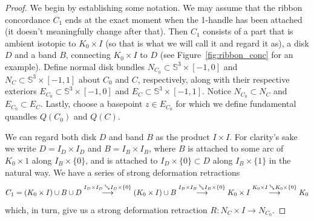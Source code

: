 \documentclass[10pt,a4paper]{amsart}
\newcommand{\retract}{\mathbin{\rotatebox[origin=c]{-45}{$\rightsquigarrow$}}}
\newcommand{\s}{\mathbb{S}}
\begin{document}
\begin{proof} 
	We begin by establishing some notation. 
	We may assume that the ribbon concordance $C_1$ ends at the exact moment when the 1-handle has been attached (it doesn't meaningfully change after that).
	Then $C_1$ consists of a part that is ambient isotopic to $K_0 \times I$ (so that is what we will call it and regard it as), a disk $D$
	and a band $B$, connecting $K_0 \times I$ to $D$ (see Figure~\ref{fig:ribbon_conc} for an example). Define normal disk bundles
	$N_{C_0} \subset \s^3 \times [-1,0]$ and $N_C \subset \s^3 \times [-1,1]$ about $C_0$ and $C$, respectively,
	along with their respective exteriors $E_{C_0} \subset \s^3 \times [-1,0]$ and $E_C \subset \s^3 \times [-1,1]$.
	Notice $N_{C_0}  \subset N_C$ and $E_{C_0} \subset E_C$.
	Lastly, choose a basepoint $z \in E_{C_0}$ for which we define fundamental quandles $Q(C_0)$ and $Q(C)$.


	We can regard both disk $D$ and band $B$ as the product $I \times I$. For clarity's sake we write $D = I_D \times I_D$ and $B = I_B \times I_B$, where $B$ is attached
	to some arc of $K_0 \times {1}$ {along} $I_B \times \{0\}$, and is attached to $I_D \times \{0\} \subset D$ {along} $I_B \times \{1\}$ in the natural way.
	We have a series of strong deformation retractions
	{ \small
	$$C_1 = (K_0 \times I) \cup B \cup D \overset{I_D \times I_D \retract I_D \times \{0\}}{\longrightarrow} (K_0 \times I) \cup B 
	\overset{I_B \times I_B \retract I_B \times \{0\}}{\longrightarrow} K_0 \times I
	\overset{K_0 \times I \retract K_0 \times \{0\}}{\longrightarrow} K_0$$
	}
	which, in turn, give us a strong deformation retraction $R \colon N_C \times I \to N_{C_0}$.



\end{proof}
\end{document}
